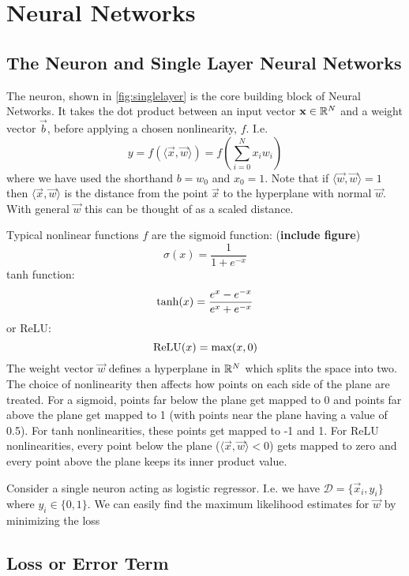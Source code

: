 \section{Neural Networks}\label{sec:cnns}
\subsection{The Neuron and Single Layer Neural Networks}
The neuron, shown in \autoref{fig:singlelayer} is the core building block of Neural Networks. It
takes the dot product between an  input vector $\vec{x} \in \reals[N]$ and a weight vector $\vec{b}$, before 
applying a chosen nonlinearity, $f$. I.e.
$$y = f(\langle\vec{x}, \vec{w}\rangle) = f\left(\sum_{i=0}^{N} x_i w_i \right) $$
where we have used the shorthand $b=w_0$ and $x_0 =
1$. Note that if $\langle\vec{w}, \vec{w}\rangle = 1$ then $\langle\vec{x}, \vec{w}\rangle$ is the
distance from the point $\vec{x}$ to the hyperplane with normal $\vec{w}$. With general $\vec{w}$
this can be thought of as a scaled distance.  

Typical nonlinear functions $f$ are the sigmoid function: (\textbf{include figure})
$$\sigma(x) = \frac{1}{1+e^{-x}}$$
tanh function:
$$\F{tanh}(x) = \frac{e^{x} - e^{-x}}{e^{x} + e^{-x}}$$
or ReLU:
$$\F{ReLU}(x) = \max (x, 0)$$
The weight vector $\vec{w}$ defines a hyperplane in $\reals[N]$ which splits the space into two. The
choice of nonlinearity then affects how points on each side of the plane are treated. For a
sigmoid, points far below the plane get mapped to 0 and points far above the plane get
mapped to 1 (with points near the plane having a value of 0.5). For tanh nonlinearities, these
points get mapped to -1 and 1. For ReLU nonlinearities, every point below the plane ($\langle\vec{x},
\vec{w}\rangle < 0$) gets mapped to zero and every point above the plane keeps its inner product value.
\begin{figure}
  \centering
  \label{fig:singlelayer}
\end{figure}

Consider a single neuron acting as logistic regressor. I.e. we have $\mathcal{D} = \{\vec{x}_i,
y_i\}$ where $y_i \in \{0, 1\}$. We can easily find the maximum likelihood estimates for $\vec{w}$
by minimizing the loss
\subsection{Loss or Error Term}


